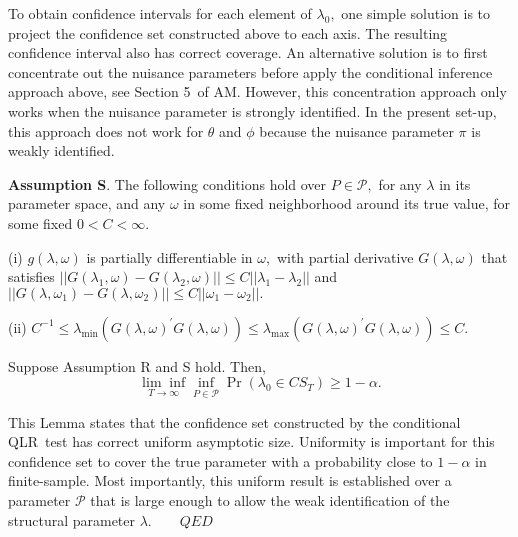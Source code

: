 \documentclass[11pt, letterpaper, twoside]{article}
\begin{document}
\smallskip

To obtain confidence intervals for each element of $\lambda _{0},$ one
simple solution is to project the confidence set constructed above to each
axis. The resulting confidence interval also has correct coverage. An
alternative solution is to first concentrate out the nuisance parameters
before apply the conditional inference approach above, see Section 5\ of AM.
However, this concentration approach only works when the nuisance parameter
is strongly identified. In the present set-up, this approach does not work
for $\theta $ and $\phi $ because the nuisance parameter $\pi $ is weakly
identified.

\smallskip

\noindent \textbf{Assumption S}. The following conditions hold over $P\in 
\mathcal{P},$ for any $\lambda $ in its parameter space, and any $\omega $
in some fixed neighborhood around its true value, for some fixed $0<C<\infty
.$

\noindent (i) $g(\lambda ,\omega )$ is partially differentiable in $\omega ,$
with partial derivative $G(\lambda ,\omega )$ that satisfies $||G(\lambda
_{1},\omega )-G(\lambda _{2},\omega )||\leq C||\lambda _{1}-\lambda _{2}||$
and $||G(\lambda ,\omega _{1})-G(\lambda ,\omega _{2})||\leq C||\omega
_{1}-\omega _{2}||.$

\noindent (ii) $C^{-1}\leq \lambda _{\min }(G(\lambda ,\omega )^{\prime
}G(\lambda ,\omega ))\leq \lambda _{\max }(G(\lambda ,\omega )^{\prime
}G(\lambda ,\omega ))\leq C$.

\smallskip

\begin{lemma}
\label{Lemma CS}Suppose Assumption R and S hold. Then, 
\begin{equation*}
\underset{T\rightarrow \infty }{\lim \inf }\underset{P\in \mathcal{P}}{\inf }%
\Pr \left( \lambda _{0}\in CS_{T}\right) \geq 1-\alpha .
\end{equation*}
\end{lemma}

This Lemma states that the confidence set constructed by the conditional
QLR\ test has correct uniform asymptotic size. Uniformity is important for
this confidence set to cover the true parameter with a probability close to $%
1-\alpha $ in finite-sample. Most importantly, this uniform result is
established over a parameter $\mathcal{P}$ that is large enough to allow the
weak identification of the structural parameter $\lambda .\qquad QED$

\bigskip
\end{document}
